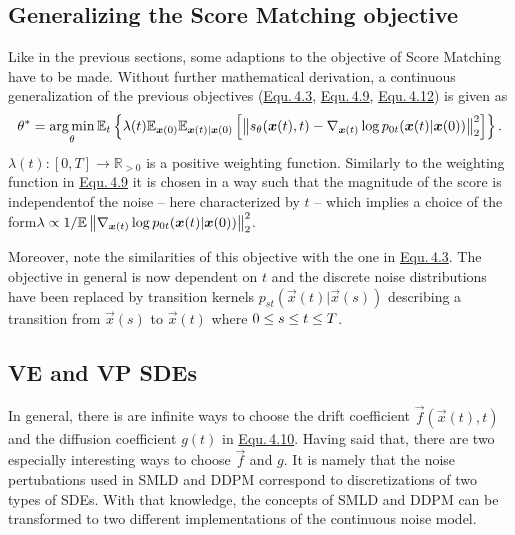 \subsection{Generalizing the Score Matching objective} \label{sec:4.4.3}
Like in the previous sections, some adaptions to the objective of Score Matching have to be made. Without further mathematical derivation, a continuous generalization of the previous objectives (\hyperref[equ:4.3]{Equ.\,4.3}, \hyperref[equ:4.9]{Equ.\,4.9}, \hyperref[equ:4.12]{Equ.\,4.12}) is given as
%
\begin{equation} \label{equ:4.14}
    \theta^*=\underset{\theta}{\arg\min}\,\mathbb{E}_t\left\{\lambda(t)\mathbb{E}_{\boldsymbol{x}(0)}\mathbb{E}_{\boldsymbol{x}(t)|\boldsymbol{x}(0)}\left[\left\lVert s_\theta(\boldsymbol{x}(t),t)-\nabla_{\boldsymbol{x}(t)}\log p_{0t}(\boldsymbol{x}(t)|\boldsymbol{x}(0))\right\rVert_2^2\right]\right\}.
\end{equation}
%
$\lambda(t):[0,T]\rightarrow\mathbb{R}_{>0}$ is a positive weighting function. Similarly to the weighting function in \hyperref[equ:4.9]{Equ.\,4.9} it is chosen in a way such that the magnitude of the score is independent\linebreak of the noise – here characterized by $t$ – which implies a choice of the form\linebreak $\lambda\propto\nolinebreak 1/\mathbb{E}\norm{\nabla_{\vec{x}(t)}\log p_{0t}(\vec{x}(t)|\vec{x}(0))}_2^2$.

Moreover, note the similarities of this objective with the one in \hyperref[equ:4.3]{Equ.\,4.3}. The objective in general is now dependent on $t$ and the discrete noise distributions have been replaced by transition kernels $p_{st}(\vec{x}(t)|\vec{x}(s))$ describing a transition from $\vec{x}(s)$ to $\vec{x}(t)$ where $0\leq\nolinebreak s\nolinebreak \leq\nolinebreak t \leq\nolinebreak T$.
%
\subsection{VE and VP SDEs} \label{sec:4.4.4}
In general, there is are infinite ways to choose the drift coefficient $\vec{f}(\vec{x}(t),t)$ and the diffusion coefficient $g(t)$ in \hyperref[equ:4.10]{Equ.\,4.10}. Having said that, there are two especially interesting ways to choose $\vec{f}$ and $g$. It is namely that the noise pertubations used in SMLD and DDPM correspond to discretizations of two types of SDEs. With that knowledge, the concepts of SMLD and DDPM can be transformed to two different implementations of the continuous noise model.

